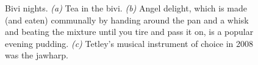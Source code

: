 \begin{figure}[t!]
    \begin{subfigure}[t]{0.49\textwidth}
        \centering
        \caption{} \label{jarvist anal}
    \end{subfigure}
    \hfill
    \begin{subfigure}[t]{0.49\textwidth}
        \centering
        \caption{} \label{tetley jawharp}
    \end{subfigure}

    \caption{Bivi nights.
    \textit{(a)} Tea in the bivi.    \textit{(b)} Angel delight, which is made (and eaten) communally by handing around the pan and a whisk and beating the mixture until you tire and pass it on, is a popular evening pudding.
    \textit{(c)} Tetley's musical instrument of choice in 2008 was the jawharp. }
\end{figure}